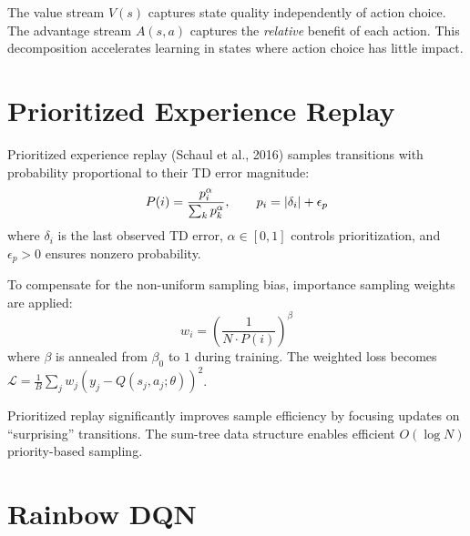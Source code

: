 \begin{intuition}
The value stream $V(s)$ captures state quality independently of action
choice. The advantage stream $A(s,a)$ captures the \emph{relative}
benefit of each action. This decomposition accelerates learning in
states where action choice has little impact.
\end{intuition}

\section{Prioritized Experience Replay}
\label{sec:per}

\begin{definition}
Prioritized experience replay (Schaul et al., 2016) samples transitions
with probability proportional to their TD error magnitude:
\[
    P(i) = \frac{p_i^\alpha}{\sum_k p_k^\alpha}, \qquad
    p_i = \left| \delta_i \right| + \epsilon_p
\]
where $\delta_i$ is the last observed TD error, $\alpha \in [0,1]$
controls prioritization, and $\epsilon_p > 0$ ensures nonzero
probability.
\end{definition}

\begin{definition}
To compensate for the non-uniform sampling bias, importance sampling
weights are applied:
\[
    w_i = \left(\frac{1}{N \cdot P(i)}\right)^\beta
\]
where $\beta$ is annealed from $\beta_0$ to $1$ during training. The
weighted loss becomes
$\mathcal{L} = \frac{1}{B}\sum_j w_j (y_j - Q(s_j, a_j; \theta))^2$.
\end{definition}

\begin{remark}
Prioritized replay significantly improves sample efficiency by focusing
updates on ``surprising'' transitions. The sum-tree data structure
enables efficient $O(\log N)$ priority-based sampling.
\end{remark}

\section{Rainbow DQN}
\label{sec:rainbow}

